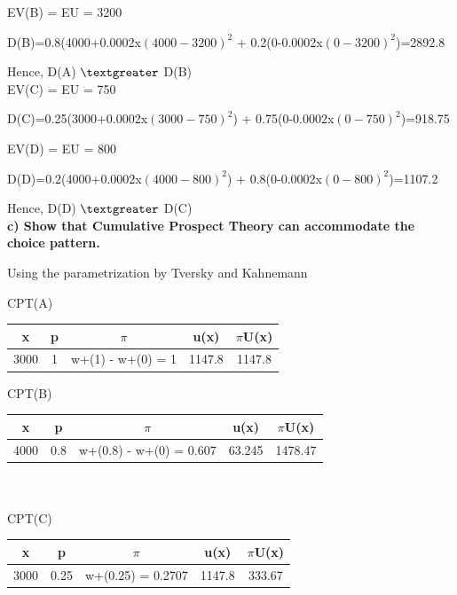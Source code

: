 \documentclass{article}
\begin{document}
  EV(B) = EU = 3200
  
  D(B)=0.8(4000+0.0002x$(4000-3200)^2$ + 0.2(0-0.0002x$(0-3200)^2$)=2892.8
  
  Hence, D(A) $\textgreater$ D(B)\\

EV(C) = EU = 750

D(C)=0.25(3000+0.0002x$(3000-750)^2$) + 0.75(0-0.0002x$(0-750)^2$)=918.75

EV(D) = EU = 800

D(D)=0.2(4000+0.0002x$(4000-800)^2$) + 0.8(0-0.0002x$(0-800)^2$)=1107.2

  Hence, D(D) $\textgreater$ D(C)\\
  
\textbf{ c) Show that Cumulative Prospect Theory can accommodate the choice pattern. }   

\vspace{2mm}

Using the parametrization by Tversky and Kahnemann

\vspace{3mm}

CPT(A)

	\begin{tabular}{|c|c|c|c|c|}
	\hline
		x    & p & $\pi$         & u(x)        & $\pi$U(x)  \\  \hline
			3000 & 1 & w+(1) - w+(0) = 1 &1147.8 & 1147.8 \\
	\hline
	\end{tabular} 
\vspace{7mm}

CPT(B)

	\begin{tabular}{|c|c|c|c|c|}
		\hline
		x    & p & $\pi$             & u(x) & $\pi$U(x) \\  \hline
		4000 & 0.8 & w+(0.8) - w+(0) = 0.607 & 63.245  &  1478.47 \\
		\hline
	\end{tabular} \\ \\

CPT(C)

\begin{tabular}{|c|c|c|c|c|}
	\hline
	x    & p & $\pi$             & u(x) & $\pi$U(x) \\  \hline
	3000 & 0.25 & w+(0.25) = 0.2707 & 1147.8  &  333.67 \\
	\hline
\end{tabular} \\ \\
\end{document}
